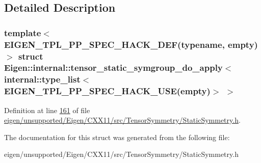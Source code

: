 \subsection{Detailed Description}
\subsubsection*{template$<$E\+I\+G\+E\+N\+\_\+\+T\+P\+L\+\_\+\+P\+P\+\_\+\+S\+P\+E\+C\+\_\+\+H\+A\+C\+K\+\_\+\+D\+E\+F(typename, empty)$>$\newline
struct Eigen\+::internal\+::tensor\+\_\+static\+\_\+symgroup\+\_\+do\+\_\+apply$<$ internal\+::type\+\_\+list$<$ E\+I\+G\+E\+N\+\_\+\+T\+P\+L\+\_\+\+P\+P\+\_\+\+S\+P\+E\+C\+\_\+\+H\+A\+C\+K\+\_\+\+U\+S\+E(empty)$>$ $>$}



Definition at line \hyperlink{eigen_2unsupported_2_eigen_2_c_x_x11_2src_2_tensor_symmetry_2_static_symmetry_8h_source_l00161}{161} of file \hyperlink{eigen_2unsupported_2_eigen_2_c_x_x11_2src_2_tensor_symmetry_2_static_symmetry_8h_source}{eigen/unsupported/\+Eigen/\+C\+X\+X11/src/\+Tensor\+Symmetry/\+Static\+Symmetry.\+h}.



The documentation for this struct was generated from the following file\+:\begin{DoxyCompactItemize}
\item 
eigen/unsupported/\+Eigen/\+C\+X\+X11/src/\+Tensor\+Symmetry/\+Static\+Symmetry.\+h\end{DoxyCompactItemize}
